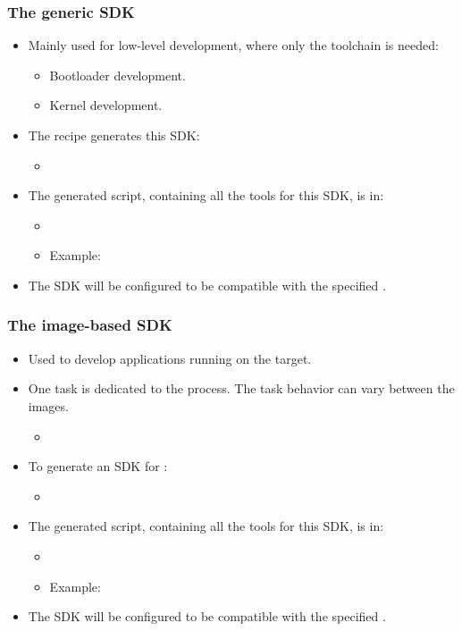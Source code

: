 \begin{frame}
  \frametitle{The generic SDK}
  \begin{itemize}
    \item Mainly used for low-level development, where only the
      toolchain is needed:
      \begin{itemize}
        \item Bootloader development.
        \item Kernel development.
      \end{itemize}
    \item The recipe  generates this SDK:
      \begin{itemize}
        \item {}
      \end{itemize}
    \item The generated script, containing all the tools for this SDK,
      is in:
      \begin{itemize}
        \item {}
        \item Example:
      \end{itemize}
    \item The SDK will be configured to be compatible with the
      specified .
  \end{itemize}
\end{frame}

\begin{frame}
  \frametitle{The image-based SDK}
  \begin{itemize}
    \item Used to develop applications running on the target.
    \item One task is dedicated to the process. The task behavior
      can vary between the images.
      \begin{itemize}
        \item {}
      \end{itemize}
    \item To generate an SDK for :
      \begin{itemize}
        \item {}
      \end{itemize}
    \item The generated script, containing all the tools for this SDK,
      is in:
      \begin{itemize}
        \item {}
        \item Example:
      \end{itemize}
    \item The SDK will be configured to be compatible with the
      specified .
  \end{itemize}
\end{frame}

